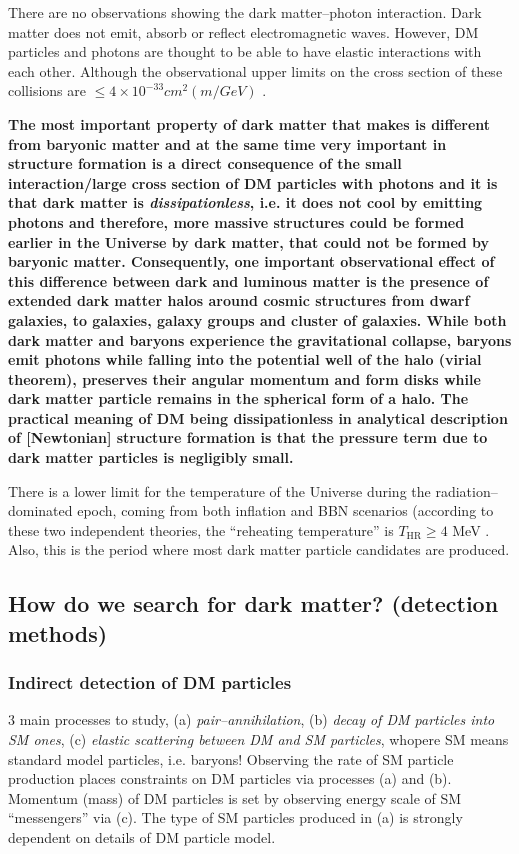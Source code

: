 \documentclass[paper=a4, fontsize=11pt]{scrartcl} %
\numberwithin{equation}{section} %
\numberwithin{figure}{section} %
\numberwithin{table}{section} %
\begin{document}
There are no observations showing the dark matter--photon interaction. Dark matter does not emit, absorb or reflect electromagnetic waves. However, DM particles and photons are thought to be able to have elastic interactions with each other. Although the observational upper limits on the cross section of these collisions are $\leq 4\times 10^\mathrm{-33} cm^2(m/GeV)$ \citep[38][]{Boehm+2014}.

{\bf The most important property of dark matter that makes is different from baryonic matter and at the same time very important in structure formation is a direct consequence of the small interaction/large cross section of DM particles with photons and it is that dark matter is \emph{dissipationless}, i.e. it does not cool by emitting photons and therefore, more massive structures could be formed earlier in the Universe by dark matter, that could not be formed by baryonic matter. Consequently, one important observational effect of this difference between dark and luminous matter is the presence of extended dark matter halos around cosmic structures from dwarf galaxies, to galaxies, galaxy groups and cluster of galaxies. While both dark matter and baryons experience the gravitational collapse, baryons emit photons while falling into the potential well of the halo (virial theorem), preserves their angular momentum and form disks while dark matter particle remains in the spherical form of a halo. The practical meaning of DM being dissipationless in analytical description of [Newtonian] structure formation is that the pressure term due to dark matter particles is negligibly small.}

There is a lower limit for the temperature of the Universe during the radiation--dominated epoch, coming from both inflation and BBN scenarios (according to these two independent theories, the ``reheating temperature'' is $T_\mathrm{HR} \geq 4$ MeV \citep[10][]{Hannestad2004}. Also, this is the period where most dark matter particle candidates are produced.

\subsection{How do we search for dark matter? (detection methods)}

\subsubsection{Indirect detection of DM particles}

3 main processes to study, (a) \emph{pair--annihilation}, (b) \emph{decay of DM particles into SM ones}, (c) \emph{elastic scattering between DM and SM particles}, whopere SM means standard model particles, i.e. baryons!
Observing the rate of SM particle production places constraints on DM particles via processes (a) and (b).
Momentum (mass) of DM particles is set by observing energy scale of SM ``messengers'' via (c).
The type of SM particles produced in (a) is strongly dependent on details of DM particle model.
\end{document}
